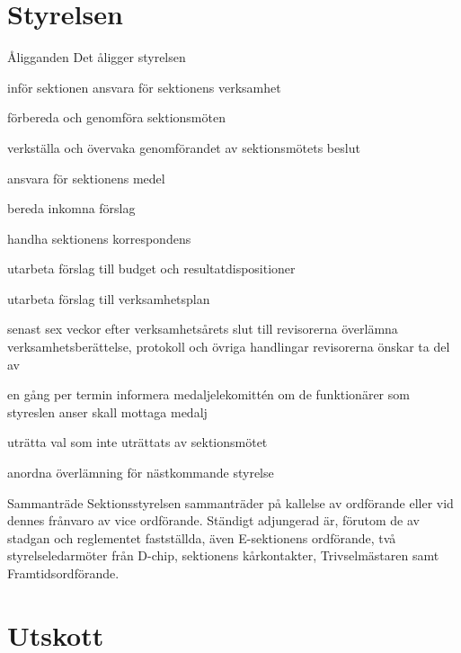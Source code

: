 \documentclass[pdfbookmarks,a4paper,11pt]{article}
\newlength{\itemcollength}
\newenvironment{reglemlista}{%
  \begin{list}{}{%
      \setlength{\labelwidth}{\itemcollength}%
      \setlength{\leftmargin}{\labelwidth + \labelsep}%
      \renewcommand{\makelabel}[1]{%
        \raisebox{0pt}[1ex][0pt]{%
          \makebox[\labelwidth][l]{%
            \parbox[t]{\itemcollength}{%
              \raggedright\hspace{0pt}##1}}}\hfill}%
      }}{%
  \end{list}}
\begin{document}
\section{Styrelsen}

\begin{reglemlista}

	\item[Åligganden]
	Det åligger styrelsen
	\begin{attlista}
		\item inför sektionen ansvara för sektionens verksamhet
		\item förbereda och genomföra sektionsmöten
		\item verkställa och övervaka genomförandet av sektionsmötets beslut
		\item ansvara för sektionens medel
		\item bereda inkomna förslag
		\item handha sektionens korrespondens
		\item utarbeta förslag till budget och resultatdispositioner
		\item utarbeta förslag till verksamhetsplan
		\item senast sex veckor efter verksamhetsårets slut till revisor\-erna överlämna verksamhetsberättelse, protokoll och övriga handlingar revisorerna önskar ta del av
		\item en gång per termin informera medaljelekomittén om de funktionärer som styreslen anser skall mottaga medalj
		\item uträtta val som inte uträttats av sektionsmötet
		\item anordna överlämning för nästkommande styrelse
	\end{attlista}

	\item[Sammanträde]
	Sektionsstyrelsen sammanträder på kallelse av ordförande eller vid dennes frånvaro av vice ordförande. Ständigt adjungerad är, förutom de av stadgan och reglementet fastställda, även E-sektionens
	ordförande, två styrelseledarmöter från D-chip, sektionens kårkontakter, Trivselmästaren
	samt Framtidsordförande.

\end{reglemlista}

\section{Utskott}
\end{document}
